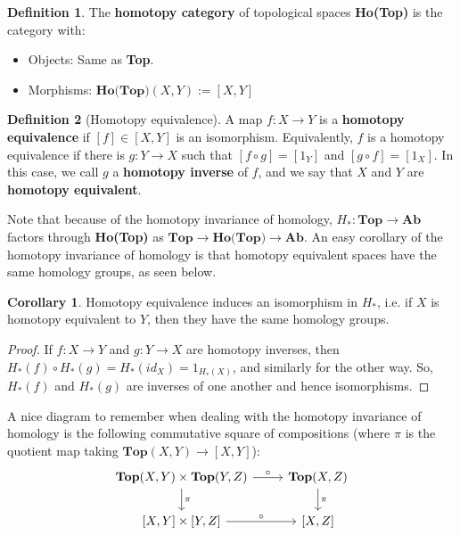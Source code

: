 \documentclass[11pt, oneside]{amsart}   	%
\theoremstyle{definition}
\newtheorem{definition}{Definition}[section]
\newtheorem{corollary}{Corollary}[theorem]
\begin{document}
\begin{definition}
	The \textbf{homotopy category} of topological spaces \textbf{Ho(Top)} is the category with:
	\begin{itemize}
		\item Objects: Same as \textbf{Top}.
		\item Morphisms: $\textbf{Ho(Top)}(X, Y) := [X, Y]$
	\end{itemize}
\end{definition}

\begin{definition}[Homotopy equivalence]
	A map $f : X\rightarrow Y$ is a \textbf{homotopy equivalence} if $[f]\in [X, Y]$ is an isomorphism. Equivalently, $f$ 
	is a homotopy equivalence if there is $g : Y\rightarrow X$ such that $[f\circ g] = [1_Y]$ and $[g\circ f] = [1_X]$. 
	In this case, we call $g$ a \textbf{homotopy inverse} of $f$, and we say that $X$ and $Y$ are \textbf{homotopy 
	equivalent}. 
\end{definition}

Note that because of the homotopy invariance of homology, $H_* : \textbf{Top}\rightarrow\textbf{Ab}$ factors through 
\textbf{Ho(Top)} as $\textbf{Top}\rightarrow\textbf{Ho(Top)}\rightarrow\textbf{Ab}$. An easy corollary of the homotopy 
invariance of homology is that homotopy equivalent spaces have the same homology groups, as seen below.

\begin{corollary}
	Homotopy equivalence induces an isomorphism in $H_*$, i.e. if $X$ is homotopy equivalent to $Y$, then they have the 
	same homology groups. 
\end{corollary}
\begin{proof}
	If $f : X\rightarrow Y$ and $g : Y\rightarrow X$ are homotopy inverses, then $H_*(f)\circ H_*(g) = H_*(id_X) = 
	1_{H_*(X)}$, and similarly for the other way. So, $H_*(f)$ and $H_*(g)$ are inverses of one another and hence 
	isomorphisms.
\end{proof}

A nice diagram to remember when dealing with the homotopy invariance of homology is the following commutative square 
of compositions (where $\pi$ is the quotient map taking $\textbf{Top}(X, Y)\rightarrow [X, Y]$):
\begin{equation}\begin{tikzcd}
	\textbf{Top}(X, Y)\times\textbf{Top}(Y, Z)\arrow[d, "\pi"]\arrow[r, "\circ"] & \textbf{Top}(X, Z)\arrow[d, "\pi"] \\
	\left[X, Y\right]\times \left[Y, Z\right]\arrow[r, "\circ"] & \left[X, Z\right]
\end{tikzcd}\end{equation}
\end{document}
